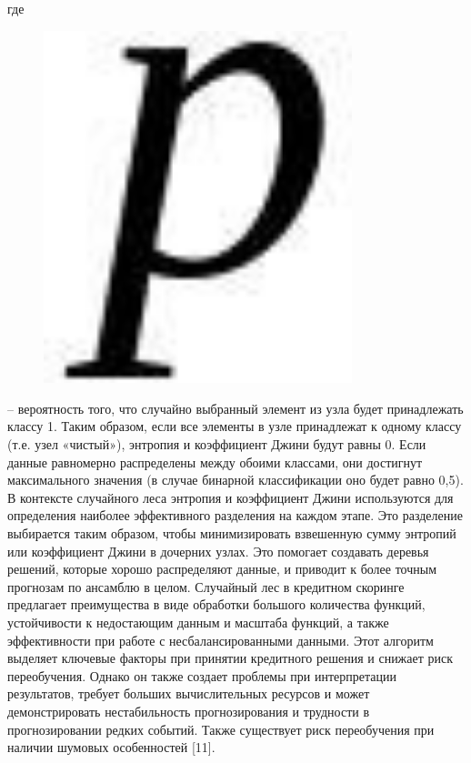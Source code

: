 где\begin{figure}[H]
	\centering
	\includegraphics[width=0.8\textwidth]{assets/114}
	\caption*{}
\end{figure}-- вероятность того, что случайно
выбранный элемент из узла будет принадлежать классу 1. Таким образом,
если все элементы в узле принадлежат к одному классу (т.е. узел
«чистый»), энтропия и коэффициент Джини будут равны 0. Если данные
равномерно распределены между обоими классами, они достигнут
максимального значения (в случае бинарной классификации оно будет равно
0,5). В контексте случайного леса энтропия и коэффициент Джини
используются для определения наиболее эффективного разделения на каждом
этапе. Это разделение выбирается таким образом, чтобы минимизировать
взвешенную сумму энтропий или коэффициент Джини в дочерних узлах. Это
помогает создавать деревья решений, которые хорошо распределяют данные,
и приводит к более точным прогнозам по ансамблю в целом. Случайный лес в
кредитном скоринге предлагает преимущества в виде обработки большого
количества функций, устойчивости к недостающим данным и масштаба
функций, а также эффективности при работе с несбалансированными данными.
Этот алгоритм выделяет ключевые факторы при принятии кредитного решения
и снижает риск переобучения. Однако он также создает проблемы при
интерпретации результатов, требует больших вычислительных ресурсов и
может демонстрировать нестабильность прогнозирования и трудности в
прогнозировании редких событий. Также существует риск переобучения при
наличии шумовых особенностей {[}11{]}.

